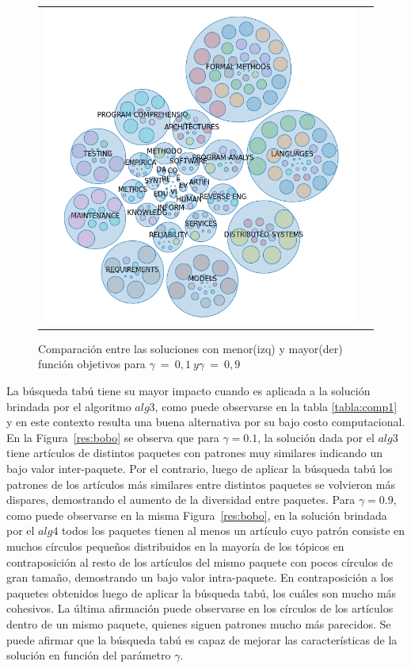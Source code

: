 \begin{figure}[H]
\begin{tabular}{cc}
		\includegraphics[width=0.45\linewidth]{img/gamma-09-burbujas-alg-1.png}\\
	\end{tabular}
	\caption{Comparación entre las soluciones con menor(izq) y mayor(der) función objetivos  para $\gamma\ =\ 0,1\ y \gamma\ =\ 0,9$}
	\label{res:comp1}
\end{figure}

La búsqueda tabú tiene su mayor impacto cuando es aplicada a la solución brindada por el algoritmo $alg3$, como puede observarse en la tabla \autoref{tabla:comp1} y en este contexto resulta una buena alternativa por su bajo costo computacional. En la Figura~\ref{res:bobo} se observa que para $\gamma=0.1$, la solución dada por el $alg3$ tiene artículos de distintos paquetes con patrones muy similares indicando un bajo valor inter-paquete. Por el contrario, luego de aplicar la búsqueda tabú los patrones de los artículos más similares entre distintos paquetes se volvieron más dispares, demostrando el aumento de la diversidad entre paquetes. Para $\gamma=0.9$, como puede observarse en la misma Figura~\ref{res:bobo}, en la solución brindada por el $alg4$ todos los paquetes tienen al menos un artículo cuyo patrón consiste en muchos círculos pequeños distribuidos en la mayoría de los tópicos en contraposición al resto de los artículos del mismo paquete con pocos círculos de gran tamaño, demostrando un bajo valor intra-paquete. En contraposición a los paquetes obtenidos luego de aplicar la búsqueda tabú, los cuáles son mucho más cohesivos. La última afirmación puede observarse en los círculos de los artículos dentro de un mismo paquete, quienes siguen patrones mucho más parecidos. Se puede afirmar que la búsqueda tabú es capaz de mejorar las características de la solución en función del parámetro $\gamma$.

